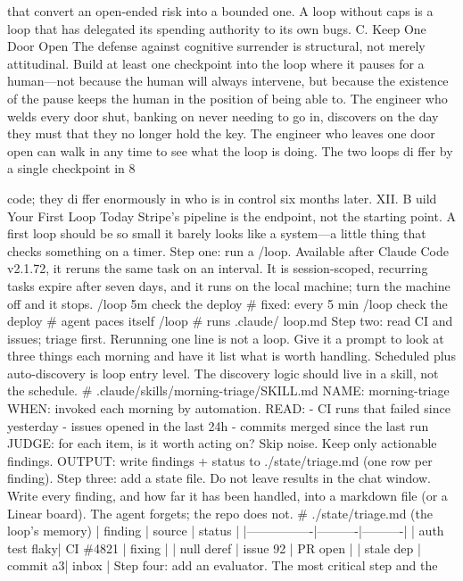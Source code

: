 \documentclass[conference]{IEEEtran}
\begin{document}
that convert an open-ended risk into a bounded one. A loop
without caps is a loop that has delegated its spending authority
to its own bugs.
C. Keep One Door Open
The defense against cognitive surrender is structural, not
merely attitudinal. Build at least one checkpoint into the loop
where it pauses for a human—not because the human will always
intervene, but because the existence of the pause keeps the human
in the position of being able to. The engineer who welds every
door shut, banking on never needing to go in, discovers on the
day they must that they no longer hold the key. The engineer
who leaves one door open can walk in any time to see what the
loop is doing. The two loops di ffer by a single checkpoint in
8




code; they di ffer enormously in who is in control six months
later.
XII. B uild Your First Loop Today
Stripe’s pipeline is the endpoint, not the starting point. A first
loop should be so small it barely looks like a system—a little
thing that checks something on a timer.
Step one: run a /loop. Available after Claude Code v2.1.72,
it reruns the same task on an interval. It is session-scoped,
recurring tasks expire after seven days, and it runs on the local
machine; turn the machine off and it stops.
/loop 5m check the deploy \# fixed: every 5 min
/loop check the deploy \# agent paces itself
/loop \# runs .claude/ loop.md
Step two: read CI and issues; triage first. Rerunning one
line is not a loop. Give it a prompt to look at three things each
morning and have it list what is worth handling. Scheduled plus
auto-discovery is loop entry level. The discovery logic should
live in a skill, not the schedule.
\# .claude/skills/morning-triage/SKILL.md
NAME: morning-triage
WHEN: invoked each morning by automation.
READ:
- CI runs that failed since yesterday
- issues opened in the last 24h
- commits merged since the last run
JUDGE: for each item, is it worth acting on?
Skip noise. Keep only actionable findings.
OUTPUT: write findings + status to
./state/triage.md (one row per finding).
Step three: add a state file. Do not leave results in the chat
window. Write every finding, and how far it has been handled,
into a markdown file (or a Linear board). The agent forgets; the
repo does not.
\# ./state/triage.md (the loop’s memory)
| finding | source | status |
|----------------|----------|----------|
| auth test flaky| CI \#4821 | fixing |
| null deref | issue 92 | PR open |
| stale dep | commit a3| inbox |
Step four: add an evaluator. The most critical step and the
\end{document}
